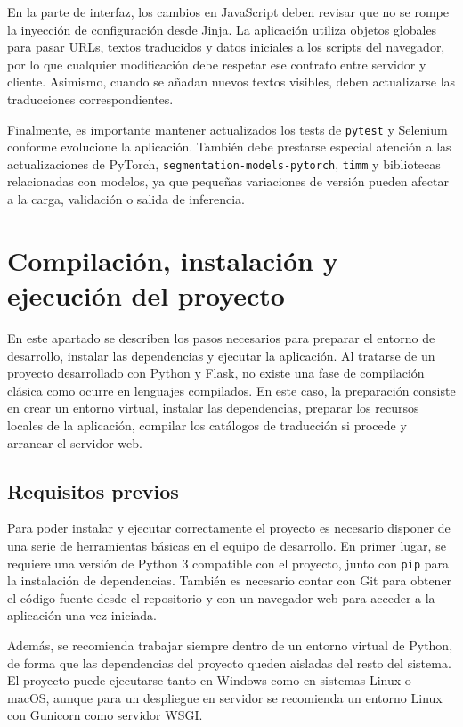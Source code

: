 En la parte de interfaz, los cambios en JavaScript deben revisar que no se rompe la inyección de configuración desde Jinja. La aplicación utiliza objetos globales para pasar URLs, textos traducidos y datos iniciales a los scripts del navegador, por lo que cualquier modificación debe respetar ese contrato entre servidor y cliente. Asimismo, cuando se añadan nuevos textos visibles, deben actualizarse las traducciones correspondientes. 

Finalmente, es importante mantener actualizados los tests de \texttt{pytest} y Selenium conforme evolucione la aplicación. También debe prestarse especial atención a las actualizaciones de PyTorch, \texttt{segmentation-models-pytorch}, \texttt{timm} y bibliotecas relacionadas con modelos, ya que pequeñas variaciones de versión pueden afectar a la carga, validación o salida de inferencia.

\section{Compilación, instalación y ejecución del proyecto}

En este apartado se describen los pasos necesarios para preparar el entorno de desarrollo, instalar las dependencias y ejecutar la aplicación. Al tratarse de un proyecto desarrollado con Python y Flask, no existe una fase de compilación clásica como ocurre en lenguajes compilados. En este caso, la preparación consiste en crear un entorno virtual, instalar las dependencias, preparar los recursos locales de la aplicación, compilar los catálogos de traducción si procede y arrancar el servidor web.

\subsection{Requisitos previos}

Para poder instalar y ejecutar correctamente el proyecto es necesario disponer de una serie de herramientas básicas en el equipo de desarrollo. En primer lugar, se requiere una versión de Python 3 compatible con el proyecto, junto con \texttt{pip} para la instalación de dependencias. También es necesario contar con Git para obtener el código fuente desde el repositorio y con un navegador web para acceder a la aplicación una vez iniciada.

Además, se recomienda trabajar siempre dentro de un entorno virtual de Python, de forma que las dependencias del proyecto queden aisladas del resto del sistema. El proyecto puede ejecutarse tanto en Windows como en sistemas Linux o macOS, aunque para un despliegue en servidor se recomienda un entorno Linux con Gunicorn como servidor WSGI.

